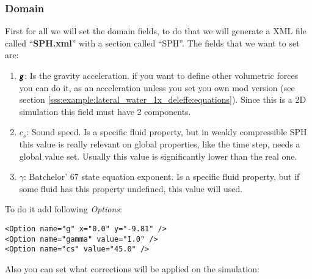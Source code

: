\subsubsection{Domain}
%
First for all we will set the domain fields, to do that we will generate a XML file called ``\textbf{SPH.xml}'' with
a section called ``SPH''. The fields that we want to set are:
%
\begin{enumerate}
	\item $\pmb{g}$: Is the gravity acceleration. if you want to define other volumetric forces you can do it, as
	an acceleration unless you set you own mod \NAME version (see section
	\ref{sss:example:lateral_water_1x_deleffe:equations}). Since this is a 2D simulation this field must have 2
	components.
	\item $c_s$: Sound speed. Is a specific fluid property, but in weakly compressible SPH this value is really
	relevant on global properties, like the time step, \NAME needs a global value set. Usually this value is
	significantly lower than the real one.
	\item $\gamma$: Batchelor' 67 state equation exponent. Is a specific fluid property, but if some fluid has this
	property undefined, this value will used. 
\end{enumerate}
%
To do it add following \textit{Options}:
%
\begin{verbatim}
<Option name="g" x="0.0" y="-9.81" />
<Option name="gamma" value="1.0" />
<Option name="cs" value="45.0" />
\end{verbatim}
%
Also you can set what corrections will be applied on the simulation:
%
